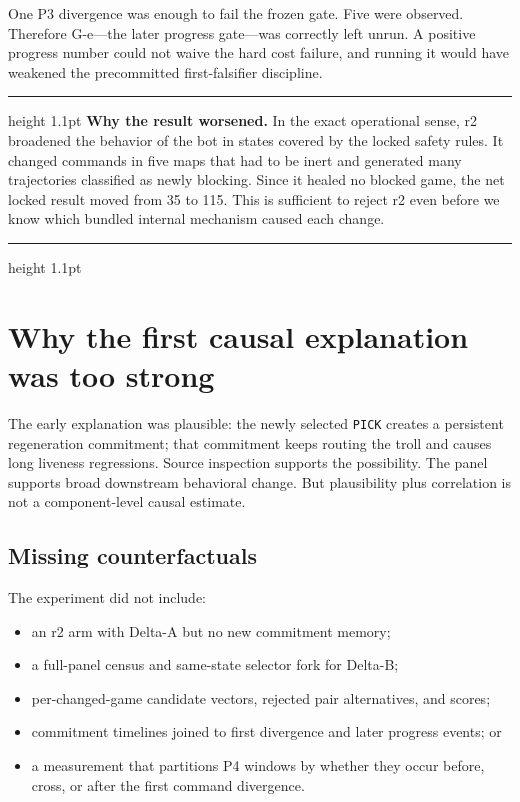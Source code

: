 \documentclass[10pt,a4paper]{article}
\newcommand{\code}[1]{\texttt{#1}}
\newenvironment{RedBox}
  {\par\medskip\noindent\begin{minipage}{\textwidth}\color{bad}\hrule height 1.1pt\vspace{5pt}\color{ink}}
  {\vspace{2pt}\color{bad}\hrule height 1.1pt\end{minipage}\par\medskip}
\begin{document}
One P3 divergence was enough to fail the frozen gate. Five were observed. Therefore G-e—the later
progress gate—was correctly left unrun. A positive progress number could not waive the hard cost
failure, and running it would have weakened the precommitted first-falsifier discipline.

\begin{RedBox}
\textbf{Why the result worsened.} In the exact operational sense, r2 broadened the behavior of the
bot in states covered by the locked safety rules. It changed commands in five maps that had to be
inert and generated many trajectories classified as newly blocking. Since it healed no blocked
game, the net locked result moved from 35 to 115. This is sufficient to reject r2 even before we
know which bundled internal mechanism caused each change.
\end{RedBox}

\section{Why the first causal explanation was too strong}

The early explanation was plausible: the newly selected \code{PICK} creates a persistent
regeneration commitment; that commitment keeps routing the troll and causes long liveness
regressions. Source inspection supports the possibility. The panel supports broad downstream
behavioral change. But plausibility plus correlation is not a component-level causal estimate.

\subsection{Missing counterfactuals}

The experiment did not include:

\begin{itemize}
  \item an r2 arm with Delta-A but no new commitment memory;
  \item a full-panel census and same-state selector fork for Delta-B;
  \item per-changed-game candidate vectors, rejected pair alternatives, and scores;
  \item commitment timelines joined to first divergence and later progress events; or
  \item a measurement that partitions P4 windows by whether they occur before, cross, or after the
        first command divergence.
\end{itemize}
\end{document}
